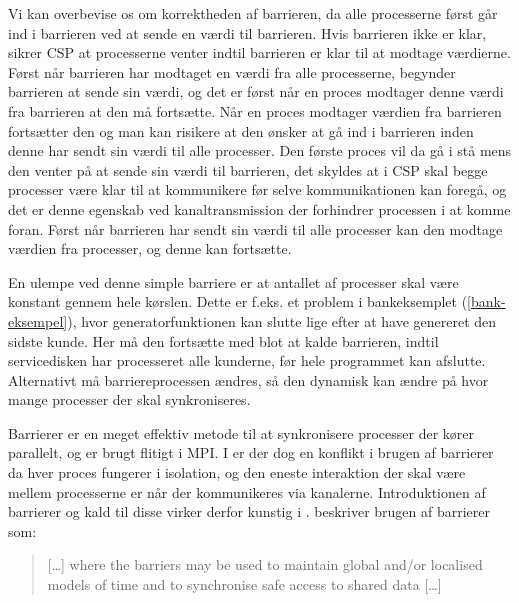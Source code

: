 Vi kan overbevise os om korrektheden af barrieren, da alle processerne først 
går ind i barrieren ved at sende en værdi til barrieren. Hvis barrieren ikke er 
klar, sikrer CSP at processerne venter indtil barrieren er klar til at modtage 
værdierne. Først når barrieren har modtaget en værdi fra alle processerne, 
begynder barrieren at sende sin værdi, og det er først når en proces modtager 
denne værdi fra barrieren at den må fortsætte. Når en proces modtager værdien 
fra barrieren fortsætter den og man kan risikere at den ønsker at gå ind i 
barrieren inden denne har sendt sin værdi til alle processer. Den første proces 
vil da gå i stå mens den venter på at sende sin værdi til barrieren, det skyldes at i CSP skal begge processer  være klar til at kommunikere før selve kommunikationen kan foregå, og det er denne egenskab ved kanaltransmission der  forhindrer processen i at komme foran. Først når barrieren har sendt sin værdi til alle 
processer kan den modtage værdien fra processer, og denne kan fortsætte. 

En ulempe ved denne simple barriere er at antallet af processer skal være 
konstant gennem hele kørslen.
Dette er f.eks. et problem i bankeksemplet (\cref{bank-eksempel}), hvor 
generatorfunktionen kan slutte lige efter at have genereret den sidste kunde.  
Her må den fortsætte med blot at kalde barrieren, indtil servicedisken har 
processeret alle kunderne, før hele programmet kan afslutte. Alternativt må 
barriereprocessen ændres, så den dynamisk kan ændre på hvor mange processer der 
skal synkroniseres. 


Barrierer er en meget effektiv metode til at synkronisere processer der kører parallelt, og er brugt flitigt i MPI. I \csp er der dog en konflikt i brugen af barrierer da hver proces fungerer i isolation, og den eneste interaktion der skal være mellem processerne er når der kommunikeres via kanalerne. Introduktionen af barrierer og kald til disse virker derfor kunstig i \csp.  beskriver brugen af barrierer som:                                \begin{otherlanguage}{english}
\begin{quote}
[\ldots] where the barriers may be used to maintain global and/or localised models of time and to synchronise safe access to shared data [\ldots]
\end{quote}
\end{otherlanguage}

